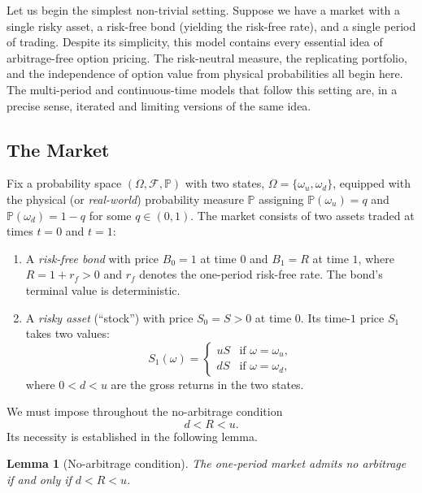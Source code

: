 \documentclass[11pt,a4paper]{article}
\theoremstyle{plain}
\newtheorem{lemma}[theorem]{Lemma}
\theoremstyle{definition}
\newcommand{\Prob}{\mathbb{P}}
\begin{document}
Let us begin the simplest non-trivial setting. Suppose we have a market with a single risky asset, a risk-free bond (yielding the risk-free rate), and a single period of trading. Despite its simplicity, this model contains every essential idea of arbitrage-free option pricing. The risk-neutral measure, the replicating portfolio, and the independence of option value from physical probabilities all begin here. The multi-period and continuous-time models that follow this setting are, in a precise sense, iterated and limiting versions of the same idea.

\subsection{The Market}
\label{subsec:market}

Fix a probability space $(\Omega, \mathcal{F}, \Prob)$ with two states,
$\Omega = \{\omega_u, \omega_d\}$, equipped with the physical (or
\emph{real-world}) probability measure $\Prob$ assigning
$\Prob(\omega_u) = q$ and $\Prob(\omega_d) = 1-q$ for some $q \in (0,1)$.
The market consists of two assets traded at times $t = 0$ and $t = 1$:

\begin{enumerate}
    \item A \emph{risk-free bond} with price $B_0 = 1$ at time $0$ and
    $B_1 = R$ at time $1$, where $R = 1 + r_f > 0$ and $r_f$ denotes the
    one-period risk-free rate. The bond's terminal value is deterministic.

    \item A \emph{risky asset} (``stock'') with price $S_0 = S > 0$ at
    time $0$. Its time-$1$ price $S_1$ takes two values:
    \[
    S_1(\omega) =
    \begin{cases}
        uS & \text{if } \omega = \omega_u, \\
        dS & \text{if } \omega = \omega_d,
    \end{cases}
    \]
    where $0 < d < u$ are the gross returns in the two states.
\end{enumerate}

We must impose throughout the no-arbitrage condition
\begin{equation}
    \label{eq:no-arb-1period}
    d < R < u.
\end{equation}
Its necessity is established in the following lemma.

\begin{lemma}[No-arbitrage condition]
\label{lem:no-arb}
The one-period market admits no arbitrage if and only if $d < R < u$.
\end{lemma}
\end{document}
